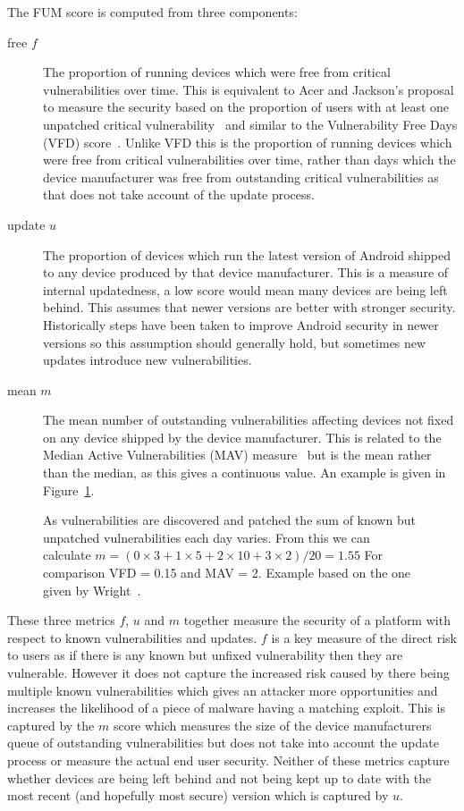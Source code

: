 The FUM score is computed from three components:
\begin{description}
  \item[free $f$] The proportion of running devices which were free from critical vulnerabilities over time. This is equivalent to Acer and Jackson's proposal to measure the security based on the proportion of users with at least one unpatched critical vulnerability~\cite{Acer2010} and similar to the Vulnerability Free Days (VFD) score~\cite{Wright2014}.
  Unlike VFD this is the proportion of running devices which were free from critical vulnerabilities over time, rather than days which the device manufacturer was free from outstanding critical vulnerabilities as that does not take account of the update process.
  \item[update $u$] The proportion of devices which run the latest version of Android shipped to any device produced by that device manufacturer. This is a measure of internal updatedness, a low score would mean many devices are being left behind.
  This assumes that newer versions are better with stronger security.
  Historically steps have been taken to improve Android security in newer versions so this assumption should generally hold, but sometimes new updates introduce new vulnerabilities.
  \item[mean $m$] The mean number of outstanding vulnerabilities affecting devices not fixed on any device shipped by the device manufacturer. This is related to the Median Active Vulnerabilities (MAV) measure~\cite{Wright2014} but is the mean rather than the median, as this gives a continuous value.
  An example is given in Figure~\ref{fig:mcalculation}.
\end{description}

\begin{figure}
\centering

\caption{As vulnerabilities are discovered and patched the sum of known but unpatched vulnerabilities each day varies. From this we can calculate $m = (0 \times 3 + 1 \times 5 + 2 \times 10 + 3 \times 2) / 20 = 1.55$ For comparison VFD = 0.15 and MAV = 2. Example based on the one given by Wright~\cite{Wright2014}.}
\label{fig:mcalculation}
\end{figure}

These three metrics $f$, $u$ and $m$ together measure the security of a platform with respect to known vulnerabilities and updates.
$f$ is a key measure of the direct risk to users as if there is any known but unfixed vulnerability then they are vulnerable.
However it does not capture the increased risk caused by there being multiple known vulnerabilities which gives an attacker more opportunities and increases the likelihood of a piece of malware having a matching exploit.
This is captured by the $m$ score which measures the size of the device manufacturers queue of outstanding vulnerabilities but does not take into account the update process or measure the actual end user security.
Neither of these metrics capture whether devices are being left behind and not being kept up to date with the most recent (and hopefully most secure) version which is captured by $u$.

